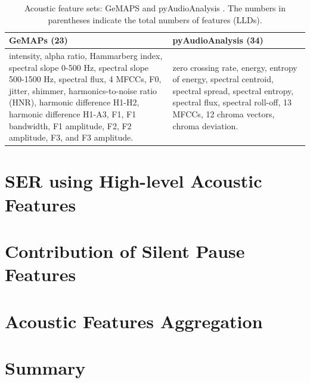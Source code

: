 \begin{table}[htpb]
  \centering
  \caption{Acoustic feature sets: GeMAPS \cite{Eyben} and pyAudioAnalysis \cite{Giannakopoulos2015}. The numbers in parentheses indicate the total numbers of features (LLDs).}
  \begin{tabular}{p{7.5cm} p{7cm}}
  \hline
  \hspace{2.5cm}GeMAPs (23) & \hspace{1.5cm}pyAudioAnalysis (34) \\
  \hline
intensity, alpha ratio, Hammarberg index, spectral slope 0-500 Hz, spectral
slope 500-1500 Hz, spectral flux, 4 MFCCs, F0, jitter, shimmer,
harmonics-to-noise ratio (HNR), harmonic difference H1-H2, harmonic difference
H1-A3, F1, F1 bandwidth, F1 amplitude, F2, F2 amplitude, F3, and F3 amplitude.
& zero crossing rate, energy, entropy of energy, spectral centroid, spectral
spread, spectral entropy, spectral flux, spectral roll-off, 13 MFCCs, 12 chroma
vectors, chroma deviation.\\
  \hline
  \end{tabular}
  \label{tab:gemaps_paa}
 \end{table}



\section{SER using High-level Acoustic Features}

\section{Contribution of Silent Pause Features}
\section{Acoustic Features Aggregation}

\section{Summary}

